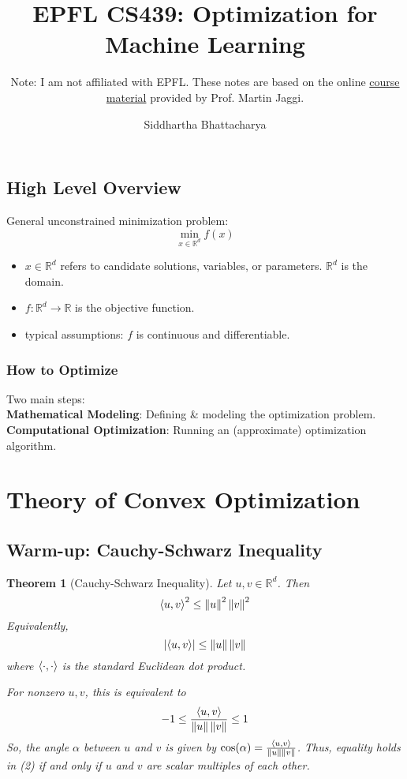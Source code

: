\documentclass[10pt]{article}
\title{EPFL CS439: Optimization for Machine Learning}
\subtitle{Note: I am not affiliated with EPFL. These notes are based on the online \href{https://github.com/epfml/OptML_course}{course material} provided by Prof. Martin Jaggi.}
\author{Siddhartha Bhattacharya}
\newcommand{\abs}[1]{\left\lvert#1\right\rvert}   					%
\newcommand{\norm}[1]{\left\lVert#1\right\rVert}					%
\newcommand{\R}{\mathbb{R}}
\newtheorem{theorem}{Theorem}[section]
\theoremstyle{remark}
\theoremstyle{definition}
\begin{document}
	
\maketitle
\tableofcontents


\subsection{High Level Overview}
General unconstrained minimization problem:
\begin{equation}
	\min_{x \in \R^d} f(x)
\end{equation} 
\begin{itemize}
	\item $x \in \R^d$ refers to candidate solutions, variables, or parameters. $\R^d$ is the domain.
	\item $f: \R^d \to \R$ is the objective function.
	\item typical assumptions: $f$ is continuous and differentiable.
\end{itemize}

\subsubsection{How to Optimize}
Two main steps:\\
\textbf{Mathematical Modeling}: Defining \& modeling the optimization problem.\\
\textbf{Computational Optimization}: Running an (approximate) optimization algorithm.

\section{Theory of Convex Optimization}
\subsection{Warm-up: Cauchy-Schwarz Inequality}
\begin{theorem}[Cauchy-Schwarz Inequality]
	Let $u, v \in \R^d$. Then 
	\begin{equation}
		\innerprod{u}{v}^2 \leq \norm{u}^2 \norm{v}^2
	\end{equation}
	Equivalently, 
	\begin{equation}
		\abs{\innerprod{u}{v}} \leq \norm{u} \norm{v}
	\end{equation}
	\noindent where $\left\langle \cdot, \cdot \right\rangle$ is the standard Euclidean dot product. 

	For nonzero $u,v$, this is equivalent to 
	\begin{equation}
		-1 \leq \frac{\innerprod{u}{v}}{\norm{u} \norm{v}} \leq 1
	\end{equation}
	So, the angle $\alpha$ between $u$ and $v$ is given by $\cos(\alpha) = \frac{\innerprod{u}{v}}{\norm{u} \norm{v}}$.
	Thus, equality holds in (2) if and only if $u$ and $v$ are scalar multiples of each other.
\end{theorem}
\end{document}
